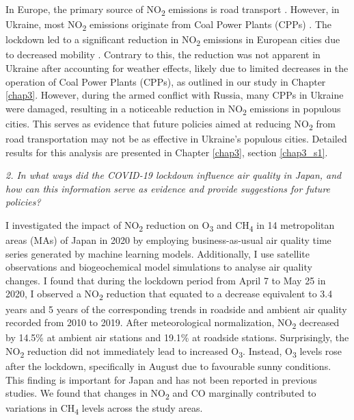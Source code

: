 In Europe, the primary source of NO\textsubscript{2} emissions is road transport \citep{aq2020eu}. However, in Ukraine, most NO\textsubscript{2} emissions originate from Coal Power Plants (CPPs) \citep{lauri2021}. The lockdown led to a significant reduction in NO\textsubscript{2} emissions in European cities due to decreased mobility \citep{barre2021estimating}. Contrary to this, the reduction was not apparent in Ukraine after accounting for weather effects, likely due to limited decreases in the operation of Coal Power Plants (CPPs), as outlined in our study in Chapter \ref{chap3}. However, during the armed conflict with Russia, many CPPs in Ukraine were damaged, resulting in a noticeable reduction in NO\textsubscript{2} emissions in populous cities. This serves as evidence that future policies aimed at reducing NO\textsubscript{2} from road transportation may not be as effective in Ukraine's populous cities. Detailed results for this analysis are presented in Chapter \ref{chap3}, section \ref{chap3_s1}. \par

\textit{2. In what ways did the COVID-19 lockdown influence air quality in Japan, and how can this information serve as evidence and provide suggestions for future policies?} \par
I investigated the impact of NO\textsubscript{2} reduction on O\textsubscript{3} and CH\textsubscript{4} in 14 metropolitan areas (MAs) of Japan in 2020 by employing business-as-usual air quality time series generated by machine learning models. Additionally, I use satellite observations and biogeochemical model simulations to analyse air quality changes. I found that during the lockdown period from April 7 to May 25 in 2020, I observed a NO\textsubscript{2} reduction that equated to a decrease equivalent to 3.4 years and 5 years of the corresponding trends in roadside and ambient air quality recorded from 2010 to 2019. After meteorological normalization, NO\textsubscript{2} decreased by 14.5\% at ambient air stations and 19.1\% at roadside stations. Surprisingly, the NO\textsubscript{2} reduction did not immediately lead to increased O\textsubscript{3}. Instead, O\textsubscript{3} levels rose after the lockdown, specifically in August due to favourable sunny conditions. This finding is important for Japan and has not been reported in previous studies. We found that changes in NO\textsubscript{2} and CO marginally contributed to variations in CH\textsubscript{4} levels across the study areas. \par

